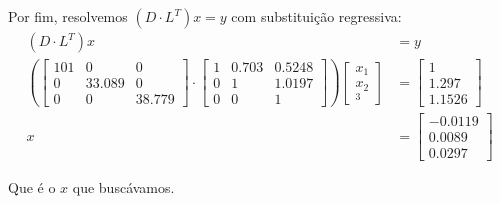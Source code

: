 \documentclass[12pt]{article}
\begin{document}
Por fim, resolvemos \((D\cdot L^T)x = y\) com substituição regressiva:
\begin{align*}
    (D\cdot L^T)x &= y \\
    \left(\begin{bmatrix}
        101 & 0 & 0 \\
        0 & 33.089 & 0 \\
        0 & 0 & 38.779
    \end{bmatrix}
    \cdot
    \begin{bmatrix}
        1 & 0.703 & 0.5248 \\
        0 & 1 & 1.0197 \\
        0 & 0 & 1
    \end{bmatrix}
    \right)
    \begin{bmatrix}
        x_1 \\
        x_2 \\
        _3
    \end{bmatrix}
    &= 
    \begin{bmatrix}
        1 \\
        1.297 \\
        1.1526
    \end{bmatrix} \\
    x &=
    \begin{bmatrix}
        -0.0119 \\
         0.0089 \\
         0.0297
    \end{bmatrix}
\end{align*}

Que é o \(x\) que buscávamos.
\end{document}
